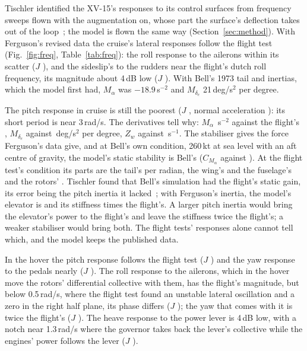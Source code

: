 \documentclass[10pt,a4paper,twocolumn]{article}
\begin{document}
Tischler identified the XV-15's responses to its control surfaces from frequency sweeps flown with the augmentation on, whose part the surface's
deflection takes out of the loop~\cite{tt}; the model is flown the same way (Section~\ref{sec:method}). With Ferguson's revised data the cruise's
lateral responses follow the flight test (Fig.~\ref{fig:freq}, Table~\ref{tab:freq}): the roll response to the ailerons within its scatter ($J$
\NQCruisepDa), and the sideslip's to the rudders near the flight's dutch roll frequency, its magnitude about 4\,dB low ($J$ \NQCruisebetaDr).
With Bell's 1973 tail and inertias, which the model first had, $M_\alpha$ was $-18.9$\,s$^{-2}$ and $M_{\delta_e}$ 21\,deg/s$^2$ per degree.

The pitch response in cruise is still the poorest ($J$ \NQCruiseqDe, normal acceleration \NQCruiseazDe): its short period is near 3\,rad/s. The
derivatives tell why: $M_\alpha$ \NQMa\,s$^{-2}$ against the flight's \NQMaFlight, $M_{\delta_e}$ \NQMde{} against \NQMdeFlight\,deg/s$^2$
per degree, $Z_w$ \NQZw{} against \NQZwFlight\,s$^{-1}$. The stabiliser gives the force Ferguson's data give, and at Bell's own condition, 260\,kt
at sea level with an aft centre of gravity, the model's static stability is Bell's ($C_{M_\alpha}$ \NDerCMa{} against \NDerCMaBell). At the flight
test's condition its parts are the tail's \NQCMaTail{} per radian, the wing's and the fuselage's \NQCMaRest{} and the rotors' \NQCMaRot. Tischler found
that Bell's simulation had the flight's static gain, its error being the pitch inertia it lacked~\cite{tt}; with Ferguson's inertia, the model's elevator
is \NQMdeRatio{} and its stiffness \NQMaRatio{} times the flight's. A larger pitch inertia would bring the elevator's power to the flight's and leave the
stiffness twice the flight's; a weaker stabiliser would bring both. The flight tests' responses alone cannot tell which, and the model keeps the
published data.

In the hover the pitch response follows the flight test ($J$ \NQHoverqDe) and the yaw response to the pedals nearly ($J$ \NQHoverrDr). The roll
response to the ailerons, which in the hover move the rotors' differential collective with them, has the flight's magnitude, but below 0.5\,rad/s,
where the flight test found an unstable lateral oscillation and a zero in the right half plane, its phase differs ($J$ \NQHoverpDa); the yaw that
comes with it is twice the flight's ($J$ \NQHoverrDa). The heave response to the power lever is 4\,dB low, with a notch near 1.3\,rad/s where the
governor takes back the lever's collective while the engines' power follows the lever ($J$ \NQHoverazDc).
\end{document}
